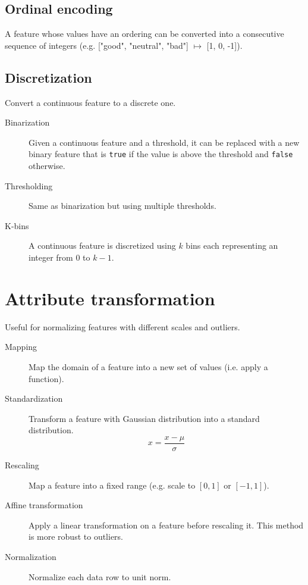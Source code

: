 \subsection{Ordinal encoding} 
    A feature whose values have an ordering can be converted into a consecutive sequence of integers
    (e.g. ["good", "neutral", "bad"] $\mapsto$ [1, 0, -1]).

\subsection{Discretization} 
    Convert a continuous feature to a discrete one.
    \begin{description}
        \item[Binarization] 
            Given a continuous feature and a threshold, 
            it can be replaced with a new binary feature that is \texttt{true} if the value is above the threshold and \texttt{false} otherwise.
        
        \item[Thresholding] 
            Same as binarization but using multiple thresholds.

        \item[K-bins] 
            A continuous feature is discretized using $k$ bins each representing an integer from $0$ to $k-1$.
    \end{description}



\section{Attribute transformation}
Useful for normalizing features with different scales and outliers.

\begin{description}
    \item[Mapping] 
        Map the domain of a feature into a new set of values (i.e. apply a function).

    \item[Standardization] 
        Transform a feature with Gaussian distribution into a standard distribution.
        \[ x = \frac{x - \mu}{\sigma} \]

    \item[Rescaling] 
        Map a feature into a fixed range (e.g. scale to $[0, 1]$ or $[-1, 1]$).

    \item[Affine transformation] 
        Apply a linear transformation on a feature before rescaling it.
        This method is more robust to outliers.

    \item[Normalization] 
        Normalize each data row to unit norm.
\end{description}
